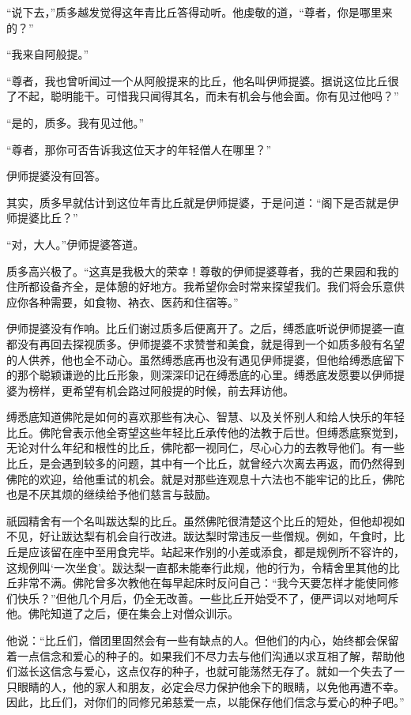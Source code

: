 \documentclass[12pt,twoside,openany]{book}
\begin{document}
“说下去，”质多越发觉得这年青比丘答得动听。他虔敬的道，“尊者，你是哪里来的？”

“我来自阿般提。”

“尊者，我也曾听闻过一个从阿般提来的比丘，他名叫伊师提婆。据说这位比丘很了不起，聪明能干。可惜我只闻得其名，而未有机会与他会面。你有见过他吗？”

“是的，质多。我有见过他。”

“尊者，那你可否告诉我这位天才的年轻僧人在哪里？”

伊师提婆没有回答。

其实，质多早就估计到这位年青比丘就是伊师提婆，于是问道：“阁下是否就是伊师提婆比丘？”

“对，大人。”伊师提婆答道。

质多高兴极了。“这真是我极大的荣幸！尊敬的伊师提婆尊者，我的芒果园和我的住所都设备齐全，是体憩的好地方。我希望你会时常来探望我们。我们将会乐意供应你各种需要，如食物、衲衣、医药和住宿等。”

伊师提婆没有作响。比丘们谢过质多后便离开了。之后，缚悉底听说伊师提婆一直都没有再回去探视质多。伊师提婆不求赞誉和美食，就是得到一个如质多般有名望的人供养，他也全不动心。虽然缚悉底再也没有遇见伊师提婆，但他给缚悉底留下的那个聪颖谦逊的比丘形象，则深深印记在缚悉底的心里。缚悉底发愿要以伊师提婆为榜样，更希望有机会路过阿般提的时候，前去拜访他。

缚悉底知道佛陀是如何的喜欢那些有决心、智慧、以及关怀别人和给人快乐的年轻比丘。佛陀曾表示他全寄望这些年轻比丘承传他的法教于后世。但缚悉底察觉到，无论对什么年纪和根性的比丘，佛陀都一视同仁，尽心心力的去教导他们。有一些比丘，是会遇到较多的问题，其中有一个比丘，就曾经六次离去再返，而仍然得到佛陀的欢迎，给他重试的机会。就是对那些连观息十六法也不能牢记的比丘，佛陀也是不厌其烦的继续给予他们慈言与鼓励。

祇园精舍有一个名叫跋达梨的比丘。虽然佛陀很清楚这个比丘的短处，但他却视如不见，好让跋达梨有机会自行改进。跋达梨时常违反一些僧规。例如，午食时，比丘是应该留在座中至用食完毕。站起来作别的小差或添食，都是规例所不容许的，这规例叫‘一次坐食’。跋达梨一直都未能奉行此规，他的行为，令精舍里其他的比丘非常不满。佛陀曾多次教他在每早起床时反问自己：“我今天要怎样才能使同修们快乐？”但他几个月后，仍全无改善。一些比丘开始受不了，便严词以对地呵斥他。佛陀知道了之后，便在集会上对僧众训示。

他说：“比丘们，僧团里固然会有一些有缺点的人。但他们的内心，始终都会保留着一点信念和爱心的种子的。如果我们不尽力去与他们沟通以求互相了解，帮助他们滋长这信念与爱心，这点仅存的种子，也就可能荡然无存了。就如一个失去了一只眼睛的人，他的家人和朋友，必定会尽力保护他余下的眼睛，以免他再遭不幸。因此，比丘们，对你们的同修兄弟慈爱一点，以能保存他们信念与爱心的种子吧。”
\end{document}
